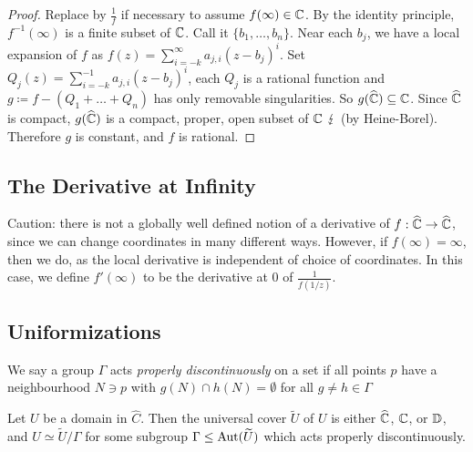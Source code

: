 \documentclass[10pt,a4paper]{article}
\begin{document}
\begin{proof}
Replace by $\frac{1}{f}$ if necessary to assume $f(\infty) \in \mathbb{C}$. By the identity principle, $f^{-1}(\infty)$ is a finite subset of $\mathbb{C}$. Call it $\{b_1, \ldots, b_n\}$. Near each $b_j$, we have a local expansion of $f$ as $f(z) = \sum_{i=-k}^\infty a_{j,i}(z-b_j)^i$. Set $Q_j(z) = \sum_{i=-k}^{-1} a_{j,i}(z-b_j)^i$, each $Q_j$ is a rational function and $g \coloneqq f - (Q_1 + \ldots + Q_n)$ has only removable singularities. So $g(\widehat{\mathbb{C}}) \subseteq \mathbb{C}$. Since $\widehat{\mathbb{C}}$ is compact, $g(\widehat{\mathbb{C}})$ is a compact, proper, open subset of $\mathbb{C}$ $\lightning$ (by Heine-Borel). Therefore $g$ is constant, and $f$ is rational.
\end{proof}

\subsection{The Derivative at Infinity}
Caution: there is not a globally well defined notion of a derivative of $f:\widehat{\mathbb{C}} \to \widehat{\mathbb{C}}$, since we can change coordinates in many different ways. However, if $f(\infty) = \infty$, then we do, as the local derivative is independent of choice of coordinates. In this case, we define $f'(\infty)$ to be the derivative at 0 of $\frac{1}{f(1/z)}$.

\subsection{Uniformizations}
We say a group $\Gamma$ acts \emph{properly discontinuously} on a set if all points $p$ have a neighbourhood $N \ni p$ with $g(N) \cap h(N) = \emptyset$ for all $g \neq h \in \Gamma$

\begin{theorem}
  Let $U$ be a domain in $\hat{C}$. Then the universal cover $\tilde{U}$ of $U$ is either $\widehat{\mathbb{C}}$, $\mathbb{C}$, or $\mathbb{D}$, and $U \simeq \tilde{U}/\Gamma$ for some subgroup $\Gamma \leq \operatorname{Aut}(\widetilde{U})$ which acts properly discontinuously.
\end{theorem}
\end{document}
